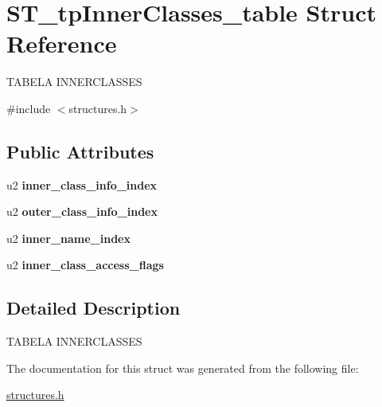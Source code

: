 \hypertarget{structST__tpInnerClasses__table}{}\section{S\+T\+\_\+tp\+Inner\+Classes\+\_\+table Struct Reference}
\label{structST__tpInnerClasses__table}




 T\+A\+B\+E\+LA I\+N\+N\+E\+R\+C\+L\+A\+S\+S\+ES  




{\ttfamily \#include $<$structures.\+h$>$}

\subsection*{Public Attributes}
\begin{DoxyCompactItemize}
\item 
\mbox{\label{structST__tpInnerClasses__table_a44af36e3c49e41a8b479ac3a614be897}} 
u2 {\bfseries inner\+\_\+class\+\_\+info\+\_\+index}
\item 
\mbox{\label{structST__tpInnerClasses__table_a8692274a3142d56283c042c3c6012559}} 
u2 {\bfseries outer\+\_\+class\+\_\+info\+\_\+index}
\item 
\mbox{\label{structST__tpInnerClasses__table_a2d25dcb182a8ea590224f6edeb996332}} 
u2 {\bfseries inner\+\_\+name\+\_\+index}
\item 
\mbox{\label{structST__tpInnerClasses__table_a48c5c1a35ce145dc91c82372ec3a16de}} 
u2 {\bfseries inner\+\_\+class\+\_\+access\+\_\+flags}
\end{DoxyCompactItemize}


\subsection{Detailed Description}


 T\+A\+B\+E\+LA I\+N\+N\+E\+R\+C\+L\+A\+S\+S\+ES 

The documentation for this struct was generated from the following file\+:\begin{DoxyCompactItemize}
\item 
\mbox{\hyperlink{structures_8h}{structures.\+h}}\end{DoxyCompactItemize}
